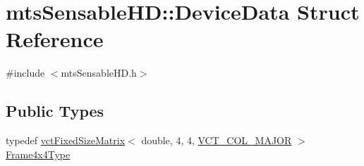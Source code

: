 \hypertarget{structmts_sensable_h_d_1_1_device_data}{}\section{mts\+Sensable\+H\+D\+:\+:Device\+Data Struct Reference}
\label{structmts_sensable_h_d_1_1_device_data}


{\ttfamily \#include $<$mts\+Sensable\+H\+D.\+h$>$}

\subsection*{Public Types}
\begin{DoxyCompactItemize}
\item 
typedef \hyperlink{classvct_fixed_size_matrix}{vct\+Fixed\+Size\+Matrix}$<$ double, 4, 4, \hyperlink{vct_forward_declarations_8h_a432cdf8923afaf82f551450ad4034746}{V\+C\+T\+\_\+\+C\+O\+L\+\_\+\+M\+A\+J\+O\+R} $>$ \hyperlink{structmts_sensable_h_d_1_1_device_data_a46ac85be135ad15c04fbe2b06a689781}{Frame4x4\+Type}
\end{DoxyCompactItemize}
